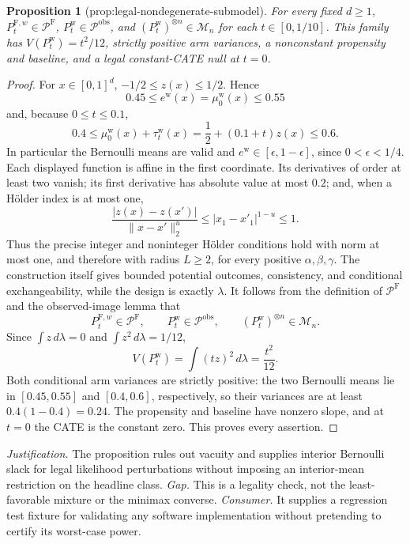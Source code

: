 \documentclass{article}
\newtheorem{proposition}{Proposition}
\begin{document}
\begin{proposition}[prop:legal-nondegenerate-submodel]\label{prop:legal-nondegenerate-submodel}
For every fixed \(d\ge1\), \(P_t^{\mathrm F,w}\in\mathcal P^{\mathrm F}\), \(P_t^{\mathrm w}\in\mathcal P^{\mathrm{obs}}\), and \((P_t^{\mathrm w})^{\otimes n}\in\mathcal M_n\) for each \(t\in[0,1/10]\). This family has \(V(P_t^{\mathrm w})=t^2/12\), strictly positive arm variances, a nonconstant propensity and baseline, and a legal constant-CATE null at \(t=0\).
\end{proposition}
\begin{proof}
For \(x\in[0,1]^d\), \(-1/2\le z(x)\le1/2\).  Hence
\[
 0.45\le e^{\mathrm w}(x)=\mu_0^{\mathrm w}(x)\le0.55
\]
and, because \(0\le t\le0.1\),
\[
 0.4\le \mu_0^{\mathrm w}(x)+\tau_t^{\mathrm w}(x)
 =\frac12+(0.1+t)z(x)\le0.6.
\]
In particular the Bernoulli means are valid and \(e^{\mathrm w}\in[\epsilon,1-\epsilon]\), since \(0<\epsilon<1/4\).  Each displayed function is affine in the first coordinate.  Its derivatives of order at least two vanish; its first derivative has absolute value at most \(0.2\); and, when a Hölder index is at most one,
\[
 \frac{|z(x)-z(x')|}{\|x-x'\|_2^u}
 \le |x_1-x'_1|^{1-u}\le1.
\]
Thus the precise integer and noninteger Hölder conditions hold with norm at most one, and therefore with radius \(L\ge2\), for every positive \(\alpha,\beta,\gamma\).  The construction itself gives bounded potential outcomes, consistency, and conditional exchangeability, while the design is exactly \(\lambda\).  It follows from the definition of \(\mathcal P^{\mathrm F}\) and the observed-image lemma that
\[
 P_t^{\mathrm F,w}\in\mathcal P^{\mathrm F},\qquad
 P_t^{\mathrm w}\in\mathcal P^{\mathrm{obs}},\qquad
 (P_t^{\mathrm w})^{\otimes n}\in\mathcal M_n.
\]
Since \(\int z\,d\lambda=0\) and \(\int z^2\,d\lambda=1/12\),
\[
 V(P_t^{\mathrm w})=\int (tz)^2\,d\lambda=\frac{t^2}{12}.
\]
Both conditional arm variances are strictly positive: the two Bernoulli means lie in \([0.45,0.55]\) and \([0.4,0.6]\), respectively, so their variances are at least \(0.4(1-0.4)=0.24\).  The propensity and baseline have nonzero slope, and at \(t=0\) the CATE is the constant zero.  This proves every assertion.
\end{proof}
\par\smallskip\noindent \textit{Justification.} The proposition rules out vacuity and supplies interior Bernoulli slack for legal likelihood perturbations without imposing an interior-mean restriction on the headline class. \textit{Gap.} This is a legality check, not the least-favorable mixture or the minimax converse. \textit{Consumer.} It supplies a regression test fixture for validating any software implementation without pretending to certify its worst-case power.
\end{document}
